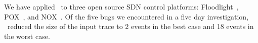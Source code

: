 We have applied \simulator~to three open source SDN control
platforms: Floodlight~\cite{bigswitch}, POX~\cite{pox}, and NOX~\cite{nox}.
Of the five bugs we encountered in a five day investigation,
\simulator~reduced the size of the input trace to 2 events in the best case
and 18 events in the worst case.



